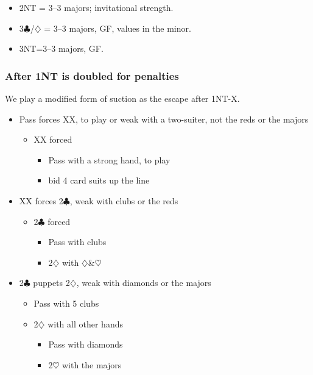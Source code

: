 \documentclass[a4paper,14pt]{extarticle}
\begin{document}
\begin{itemize}
\begin{itemize}
		\item 2NT = 3--3 majors; invitational strength.
		\item 3$\clubsuit$/$\diamondsuit$ = 3--3 majors, GF, values in the minor.
		\item 3NT=3--3 majors, GF.
		\end{itemize}
	\end{itemize}

\newpage

\subsubsection{After 1NT is doubled for penalties}
\label{sec:resp:1nx}

We play a modified form of suction as the escape after 1NT-X.

\begin{itemize}
\item Pass forces XX, to play or weak with a two-suiter, not the reds or the majors
	\begin{itemize}
	\item XX forced
		\begin{itemize}
		\item Pass with a strong hand, to play
		\item bid 4 card suits up the line
		\end{itemize}
	\end{itemize}
\item XX forces 2$\clubsuit$, weak with clubs or the reds
	\begin{itemize}
	\item 2$\clubsuit$ forced
		\begin{itemize}
		\item Pass with clubs
		\item 2$\diamondsuit$ with $\diamondsuit$\&$\heartsuit$
		\end{itemize}
	\end{itemize}
\item 2$\clubsuit$ puppets 2$\diamondsuit$, weak with diamonds or the majors
	\begin{itemize}
	\item Pass with 5 clubs
	\item 2$\diamondsuit$ with all other hands
		\begin{itemize}
		\item Pass with diamonds
		\item 2$\heartsuit$ with the majors
		\end{itemize}

\end{itemize}
\end{itemize}
\end{document}

